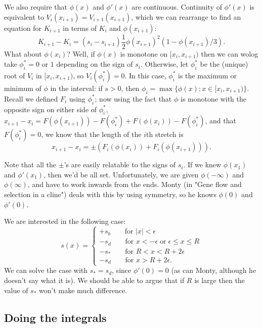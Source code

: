 \documentclass{article}
\begin{document}
We also require that $\phi(x)$ and $\phi'(x)$ are continuous.
Continuity of $\phi'(x)$ is equivalent to $V_i(x_{i+1}) = V_{i+1}(x_{i+1})$,
which we can rearrange to find an equation for $K_{i+1}$ in terms of $K_i$ and $\phi(x_{i+1})$:
\[
    K_{i+1} - K_i = (s_i - s_{i+1}) \frac{1}{2} \phi(x_{i+1})^2 (1-\phi(x_{i+1})/3) .
\]
What about $\phi(x_i)$?  Well, if $\phi(x)$ is monotone on $[x_i,x_{i+1})$ then we can wolog take $\phi_i^*=0$ or $1$ depending on the sign of $s_i$.
Otherwise, let $\phi_i^*$ be the (unique) root of $V_i$ in $[x_i,x_{i+1})$, so $V_i(\phi_i^*)=0$.
In this case, $\phi_i^*$ is the maximum or minimum of $\phi$ in the interval:
if $s>0$, then $\phi_i = \max\{ \phi(x) : x \in [x_i,x_{i+1})\}$. 
Recall we defined $F_i$ using $\phi_i^*$; now using the fact that $\phi$ is monotone with the opposite sign on either side of $\phi_i^*$,
$x_{i+1} - x_i = F(\phi(x_{i+1})) - F(\phi_i^*) + F(\phi(x_{i})) - F(\phi_i^*)$,
and that $F(\phi_i^*) = 0$,
we know that the length of the $i$th stretch is
\[
    x_{i+1} - x_i = \pm \left( F_i(\phi(x_i)) + F_i(\phi(x_{i+1})) \right).
\]

Note that all the $\pm{}$'s are easily relatable to the signs of $s_i$.
If we knew $\phi(x_1)$ and $\phi'(x_1)$, then we'd be all set.
Unfortunately, we are given $\phi(-\infty)$ and $\phi(\infty)$, and have to work inwards from the ends.
Monty (in "Gene flow and selection in a cline") deals with this by using symmetry, so he knows $\phi(0)$ and $\phi'(0)$.

We are interested in the following case:
\[
    s(x) = \begin{cases}
        +s_b \qquad \mbox{for } |x|<\epsilon \\
        -s_d \qquad \mbox{for } x<-\epsilon \; \mbox{or}\; \epsilon \le x \le R \\
        -s_* \qquad \mbox{for } R < x < R+2\epsilon \\
        -s_d \qquad \mbox{for } x>R+2\epsilon .
    \end{cases}
\]
We can solve the case with $s_* = s_d$, since $\phi'(0) = 0$ (as can Monty, although he doesn't say what it is).
We should be able to argue that if $R$ is large then the value of $s_*$ won't make much difference.

\subsection{Doing the integrals}
\end{document}
